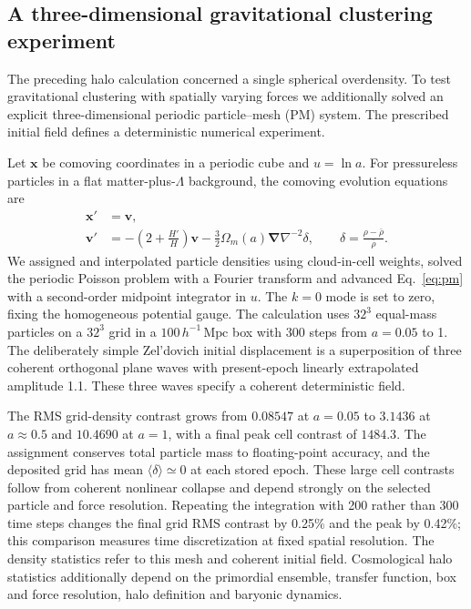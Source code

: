 \subsection{A three-dimensional gravitational clustering experiment}
\label{sec:pm3d}
The preceding halo calculation concerned a single spherical overdensity. To test gravitational clustering with spatially varying forces we additionally solved an explicit three-dimensional periodic particle--mesh (PM) system. The prescribed initial field defines a deterministic numerical experiment.

Let $\mathbf x$ be comoving coordinates in a periodic cube and $u=\ln a$. For pressureless particles in a flat matter-plus-$\Lambda$ background, the comoving evolution equations are
\begin{align}
\mathbf x'&=\mathbf v,\\
\mathbf v'&=-\left(2+\frac{H'}{H}\right)\mathbf v
-\frac32\Omega_m(a)\boldsymbol\nabla\nabla^{-2}\delta,
\qquad\delta=\frac{\rho-\bar\rho}{\bar\rho}.
\label{eq:pm}
\end{align}
We assigned and interpolated particle densities using cloud-in-cell weights, solved the periodic Poisson problem with a Fourier transform and advanced Eq.~\eqref{eq:pm} with a second-order midpoint integrator in $u$. The $k=0$ mode is set to zero, fixing the homogeneous potential gauge. The calculation uses $32^3$ equal-mass particles on a $32^3$ grid in a $100\,h^{-1}\,\mathrm{Mpc}$ box with 300 steps from $a=0.05$ to 1. The deliberately simple Zel'dovich initial displacement is a superposition of three coherent orthogonal plane waves with present-epoch linearly extrapolated amplitude 1.1. These three waves specify a coherent deterministic field.

The RMS grid-density contrast grows from $0.08547$ at $a=0.05$ to $3.1436$ at $a\approx0.5$ and $10.4690$ at $a=1$, with a final peak cell contrast of $1484.3$. The assignment conserves total particle mass to floating-point accuracy, and the deposited grid has mean $\langle\delta\rangle\simeq0$ at each stored epoch. These large cell contrasts follow from coherent nonlinear collapse and depend strongly on the selected particle and force resolution. Repeating the integration with 200 rather than 300 time steps changes the final grid RMS contrast by 0.25\% and the peak by 0.42\%; this comparison measures time discretization at fixed spatial resolution. The density statistics refer to this mesh and coherent initial field. Cosmological halo statistics additionally depend on the primordial ensemble, transfer function, box and force resolution, halo definition and baryonic dynamics.

